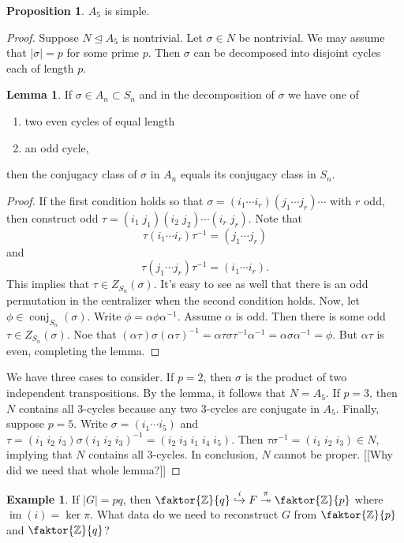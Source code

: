 \documentclass[10pt,letterpaper,cm]{nupset}
\theoremstyle{definition}
\newtheorem{exmp}{Example}
\newtheorem{prop}{Proposition}
\newtheorem{lemma}{Lemma}
\newcommand{\Z}{\mathbb Z}
\newcommand{\1}{\mathbf{1}}
\newcommand{\0}{\vec 0}
\DeclareMathOperator{\conj}{conj}
\DeclareMathOperator{\im}{im}
\begin{document}
\begin{prop}
$A_5$ is simple.
\end{prop}
\begin{proof}
Suppose $N \unlhd A_5$ is nontrivial. Let $\sigma \in N$ be nontrivial. We may assume that $|\sigma| =p$ for some prime $p$. Then $\sigma$ can be decomposed into disjoint cycles each of length $p$.
\begin{lemma}
If $\sigma \in A_n \subset S_n$ and in the decomposition of $\sigma$ we have one of
\begin{enumerate}
\item two even cycles of equal length
\item an odd cycle,
\end{enumerate}
then the conjugacy class of $\sigma$ in $A_n$ equals its conjugacy class in $S_n$.
\end{lemma}
\begin{proof}
If the first condition holds so that $\sigma = (i_1 \cdots i_r)(j_1 \cdots j_r)\cdots$ with $r$ odd, then construct odd $\tau = (i_1 \; j_1)(i_2 \; j_2) \cdots (i_r \; j_r)$. Note that $$\tau(i_1 \cdots i_r)\tau^{-1} = (j_1 \cdots j_r) $$ and $$\tau (j_1 \cdots j_r) \tau^{-1} = (i_1 \cdots i_r).$$ This implies that $\tau \in Z_{S_n}(\sigma)$. It's easy to see as well that there is an odd permutation in the centralizer when the second condition holds. Now, let $\phi \in \conj_{S_n}(\sigma)$. Write $\phi = \alpha \phi \alpha^{-1}$. Assume $\alpha$ is odd. Then there is some odd $\tau \in Z_{S_n}(\sigma)$. Noe that $(\alpha \tau) \sigma (\alpha \tau)^{-1} = \alpha \tau \sigma \tau^{-1} \alpha^{-1} = \alpha \sigma \alpha^{-1} = \phi$. But $\alpha \tau$ is even, completing the lemma.
\end{proof}
We have three cases to consider. If $p=2$, then $\sigma$ is the product of two independent transpositions. By the lemma, it follows that $N = A_5$. If $p=3$, then $N$ contains all $3$-cycles because any two $3$-cycles are conjugate in $A_5$. Finally, suppose $p=5$. Write $\sigma = (i_1 \cdots i_5)$ and $\tau = (i_1 \; i_2\; i_3) \sigma (i_1 \; i_2\; i_3)^{-1} = (i_2 \; i_3 \; i_1 \; i_4 \; i_5)$. Then $\tau \sigma^{-1} = (i_1 \; i_2 \; i_3) \in N$, implying that $N$ contains all $3$-cycles. In conclusion, $N$ cannot be proper. {[[Why did we need that whole lemma?]]}
\end{proof}

\begin{exmp}
If $|G| = pq$, then $\faktor{\Z}{q} \overset{i}{\hookrightarrow} F \overset{\pi}{\twoheadrightarrow} \faktor{\Z}{p}$ where $\im(i) = \ker \pi$. What data do we need to reconstruct $G$ from $\faktor{\Z}{p}$ and $\faktor{\Z}{q}$?
\end{exmp}
\end{document}

